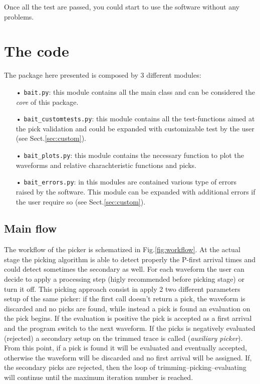 \documentclass[11pt,a4paper,twocolumns]{article}
\begin{document}
Once all the test are passed, you could start to use the software without any problems.

\section{The code}
The package here presented is composed by 3 different modules:
\begin{itemize}
\item[•] \texttt{bait.py}: this module contains all the main \bait class and can be considered the \emph{core} of this package.
\item[•] \texttt{bait\_customtests.py}: this module contains all the test-functions aimed at the pick validation and could be expanded with customizable test by the user (see Sect.\ref{sec:custom}).
\item[•] \texttt{bait\_plots.py}: this module contains the necessary function to plot the waveforms and relative \bait charachteristic functions and picks.
\item[•] \texttt{bait\_errors.py}: in this modules are contained various type of errors raised by the software. This module can be expanded with additional errors if the user require so (see Sect.\ref{sec:custom}).
\end{itemize}

\subsection{Main flow}
The workflow of the picker is schematized in Fig.\ref{fig:workflow}. At the actual stage the \bait picking algorithm is able to detect properly the P-first arrival times and could detect sometimes the secondary as well.
For each waveform the user can decide to apply a processing step (higly recommended before picking stage) or turn it off. This picking approach consist in apply \num{2} two different parameters setup of the same picker: if the first call doesn't return a pick, the waveform is discarded and no picks are found, while instead a pick is found an evaluation on the pick begins. If the evaluation is positive the pick is accepted as a first arrival and  the program switch to the next waveform. If the picks is negatively evaluated (rejected) a secondary setup on the trimmed trace is called (\textit{auxiliary picker}). From this point, if a pick is found it will be evaluated and eventually accepted, otherwise the waveform will be discarded and no first arrival will be assigned. If, the secondary picks are rejected, then the loop of trimming--picking--evaluating will continue until the maximum iteration number is reached.
\end{document}
